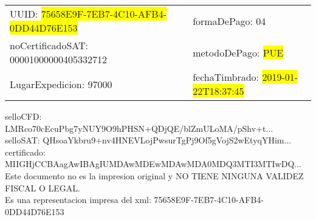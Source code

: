 \documentclass{article}
\begin{document}
\begin{tabular}{p{11cm}p{1cm}p{8cm}}
\bigskip
UUID: \colorbox{yellow}{ 75658E9F-7EB7-4C10-AFB4-0DD44D76E153 } & & formaDePago: 04\\

noCertificadoSAT: 00001000000405332712 & & metodoDePago: \colorbox{yellow}{ PUE }\\

LugarExpedicion: 97000 & & fechaTimbrado: \colorbox{yellow}{ 2019-01-22T18:37:45 } \\
\end{tabular}

\bigskip
selloCFD: LMRco70cEcuPbg7yNUY9O9hPHSN+QDjQE/blZmULoMA/pShv+t... \\
selloSAT: QHsoaYkbru9+nv4HNEVLojPwsurTgPj9Of5gVojS2wEtyqYHim... \\

certificado: MIIGHjCCBAagAwIBAgIUMDAwMDEwMDAwMDA0MDQ3MTI3MTIwDQ...\bigskip\bigskip\bigskip\bigskip\bigskip\bigskip
\\Este documento no es la impresion original y NO TIENE NINGUNA VALIDEZ FISCAL O LEGAL. \\
 Es una representacion impresa del xml:  75658E9F-7EB7-4C10-AFB4-0DD44D76E153 \\
\end{document}
